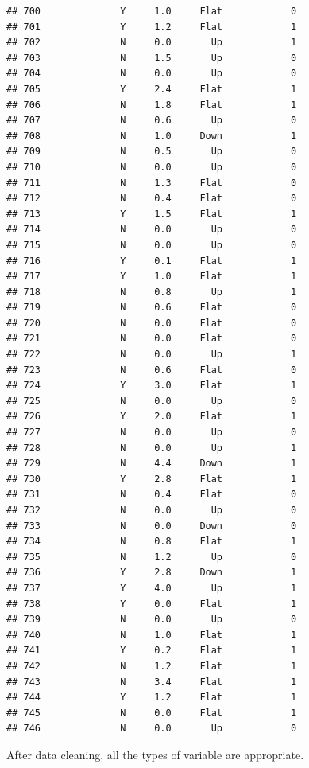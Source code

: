 \documentclass[
]{article}
\begin{document}
\begin{verbatim}
## 700              Y     1.0     Flat            0
## 701              Y     1.2     Flat            1
## 702              N     0.0       Up            1
## 703              N     1.5       Up            0
## 704              N     0.0       Up            0
## 705              Y     2.4     Flat            1
## 706              N     1.8     Flat            1
## 707              N     0.6       Up            0
## 708              N     1.0     Down            1
## 709              N     0.5       Up            0
## 710              N     0.0       Up            0
## 711              N     1.3     Flat            0
## 712              N     0.4     Flat            0
## 713              Y     1.5     Flat            1
## 714              N     0.0       Up            0
## 715              N     0.0       Up            0
## 716              Y     0.1     Flat            1
## 717              Y     1.0     Flat            1
## 718              N     0.8       Up            1
## 719              N     0.6     Flat            0
## 720              N     0.0     Flat            0
## 721              N     0.0     Flat            0
## 722              N     0.0       Up            1
## 723              N     0.6     Flat            0
## 724              Y     3.0     Flat            1
## 725              N     0.0       Up            0
## 726              Y     2.0     Flat            1
## 727              N     0.0       Up            0
## 728              N     0.0       Up            1
## 729              N     4.4     Down            1
## 730              Y     2.8     Flat            1
## 731              N     0.4     Flat            0
## 732              N     0.0       Up            0
## 733              N     0.0     Down            0
## 734              N     0.8     Flat            1
## 735              N     1.2       Up            0
## 736              Y     2.8     Down            1
## 737              Y     4.0       Up            1
## 738              Y     0.0     Flat            1
## 739              N     0.0       Up            0
## 740              N     1.0     Flat            1
## 741              Y     0.2     Flat            1
## 742              N     1.2     Flat            1
## 743              N     3.4     Flat            1
## 744              Y     1.2     Flat            1
## 745              N     0.0     Flat            1
## 746              N     0.0       Up            0
\end{verbatim}

After data cleaning, all the types of variable are appropriate.
\end{document}
